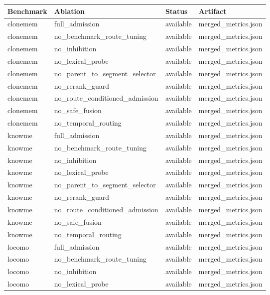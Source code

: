 \begin{tabular}{llll}
\toprule
Benchmark & Ablation & Status & Artifact \\
\midrule
clonemem & full_admission & available & merged_metrics.json \\
clonemem & no_benchmark_route_tuning & available & merged_metrics.json \\
clonemem & no_inhibition & available & merged_metrics.json \\
clonemem & no_lexical_probe & available & merged_metrics.json \\
clonemem & no_parent_to_segment_selector & available & merged_metrics.json \\
clonemem & no_rerank_guard & available & merged_metrics.json \\
clonemem & no_route_conditioned_admission & available & merged_metrics.json \\
clonemem & no_safe_fusion & available & merged_metrics.json \\
clonemem & no_temporal_routing & available & merged_metrics.json \\
knowme & full_admission & available & merged_metrics.json \\
knowme & no_benchmark_route_tuning & available & merged_metrics.json \\
knowme & no_inhibition & available & merged_metrics.json \\
knowme & no_lexical_probe & available & merged_metrics.json \\
knowme & no_parent_to_segment_selector & available & merged_metrics.json \\
knowme & no_rerank_guard & available & merged_metrics.json \\
knowme & no_route_conditioned_admission & available & merged_metrics.json \\
knowme & no_safe_fusion & available & merged_metrics.json \\
knowme & no_temporal_routing & available & merged_metrics.json \\
locomo & full_admission & available & merged_metrics.json \\
locomo & no_benchmark_route_tuning & available & merged_metrics.json \\
locomo & no_inhibition & available & merged_metrics.json \\
locomo & no_lexical_probe & available & merged_metrics.json \\

\end{tabular}
